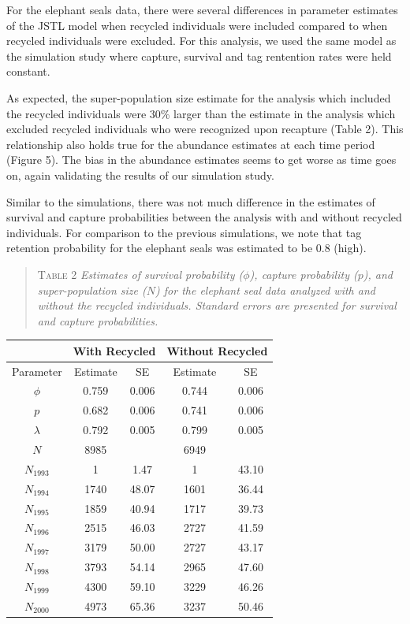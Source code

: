 \documentclass[]{article}
\begin{document}
For the elephant seals data, there were several differences in parameter
estimates of the JSTL model when recycled individuals were included
compared to when recycled individuals were excluded. For this analysis, we used the same model as the simulation study where capture, survival and tag rentention rates were held constant.  

As expected, the
super-population size estimate for the analysis which included the
recycled individuals were 30\% larger than the estimate in the analysis
which excluded recycled individuals who were recognized upon recapture
(Table 2). This relationship also holds true for the abundance estimates
at each time period (Figure 5). The bias in the abundance estimates
seems to get worse as time goes on, again validating the results of our
simulation study.

Similar to the simulations, there was not much difference in the
estimates of survival and capture probabilities between the analysis
with and without recycled individuals. For comparison to the previous
simulations, we note that tag retention probability for the
elephant seals was estimated to be 0.8 (high).

\begin{quote}
\textsc{Table 2}
\textsl{Estimates of survival probability ($\phi$), capture probability ($p$), and super-population size ($N$) for the elephant seal data analyzed with and without the recycled individuals. Standard errors are presented for survival and capture probabilities.}
\end{quote}

\begin{center}
\begin{tabular}{c c c c c}
& \multicolumn{2}{l}{With Recycled} & \multicolumn{2}{l}{Without Recycled} \\ \hline
Parameter & Estimate & SE & Estimate & SE \\ \hline
$\phi$ & 0.759 & 0.006 & 0.744 & 0.006\\
$p$ & 0.682 & 0.006 & 0.741 & 0.006 \\
$\lambda $ & 0.792 & 0.005 & 0.799 & 0.005\\
$N$ & 8985 & & 6949& \\ \hline
$N_{1993}$ & 1 & 1.47 & 1 & 43.10 \\
$N_{1994}$ & 1740 & 48.07 & 1601 & 36.44 \\
$N_{1995}$ & 1859 & 40.94 & 1717 & 39.73 \\
$N_{1996}$ & 2515 & 46.03 & 2727 & 41.59 \\
$N_{1997}$ & 3179 & 50.00 & 2727 & 43.17 \\
$N_{1998}$ & 3793 & 54.14 & 2965 & 47.60 \\
$N_{1999}$ & 4300 & 59.10 & 3229 & 46.26 \\
$N_{2000}$ & 4973 & 65.36 & 3237 & 50.46 \\
\end{tabular}
\end{center}
\end{document}
